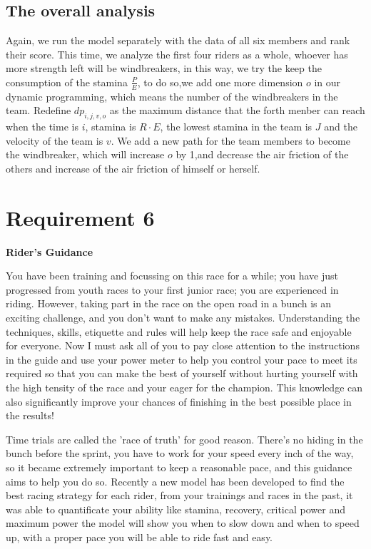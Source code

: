 \documentclass[12pt]{article}
\begin{document}
\subsection{The overall analysis}
Again, we run the model separately with the data of all six members and rank their score. This time, we analyze the first four riders as a whole, whoever has more strength
left will be windbreakers, in this way, we try the keep the consumption of the stamina $\frac{P}{E}$, to do so,we add one more dimension $o$ in our dynamic programming, which
means the number of the windbreakers in the team. Redefine $dp_{i,j,v,o}$ as the maximum distance that the forth menber can reach when the time is $i$, stamina is $R\cdot E$,
the lowest stamina in the team is $J$ and the velocity of the team is $v$. We add a new path for the team members to become the windbreaker, which will increase $o$ by 1,and
decrease the air friction of the others and increase of the air friction of himself or herself.

\newpage
\section{Requirement 6}
\begin{center}
    \huge \textbf{Rider's Guidance}
\end{center}\large
You have been training and focussing on this race for a while; you  have just progressed from youth races to your first junior race; you are experienced in riding.
However, taking part in the race on the open road in a bunch is an exciting challenge, and you don't want to make any mistakes.
Understanding the techniques, skills, etiquette and rules will help keep the race safe and enjoyable for everyone. Now I must ask all of you to pay close attention to the instructions in the guide and use your power meter
to help you control your pace to meet its required so that you can make the best of yourself without hurting yourself with the high tensity of the race and your eager for
the champion. This knowledge can also significantly improve your chances of finishing in the best possible place in the results!

Time trials are called the 'race of truth' for good reason. There's no hiding in the bunch before the sprint, you have to work for your speed every inch of the way, so it
became extremely  important to keep a reasonable pace, and this guidance aims to help you do so.
Recently a new model has been developed to find the best racing strategy for each rider, from your trainings and races in the past, it was able to quantificate your ability
like stamina, recovery, critical power and maximum power the model will show you when to slow down and when to speed up, with a proper pace you will be able to ride
fast and easy.
\end{document}
